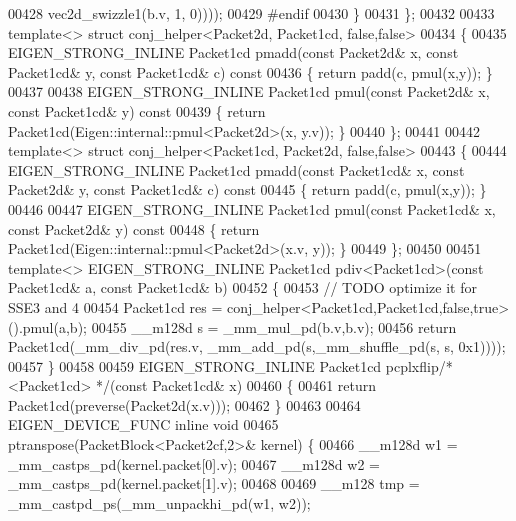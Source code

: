 \begin{DoxyCode}
00428                                            vec2d\_swizzle1(b.v, 1, 0))));
00429 \textcolor{preprocessor}{    #endif}
00430   \}
00431 \};
00432 
00433 \textcolor{keyword}{template}<> \textcolor{keyword}{struct }conj\_helper<Packet2d, Packet1cd, false,false>
00434 \{
00435   EIGEN\_STRONG\_INLINE Packet1cd pmadd(\textcolor{keyword}{const} Packet2d& x, \textcolor{keyword}{const} Packet1cd& y, \textcolor{keyword}{const} Packet1cd& c)\textcolor{keyword}{ const}
00436 \textcolor{keyword}{  }\{ \textcolor{keywordflow}{return} padd(c, pmul(x,y)); \}
00437 
00438   EIGEN\_STRONG\_INLINE Packet1cd pmul(\textcolor{keyword}{const} Packet2d& x, \textcolor{keyword}{const} Packet1cd& y)\textcolor{keyword}{ const}
00439 \textcolor{keyword}{  }\{ \textcolor{keywordflow}{return} Packet1cd(Eigen::internal::pmul<Packet2d>(x, y.v)); \}
00440 \};
00441 
00442 \textcolor{keyword}{template}<> \textcolor{keyword}{struct }conj\_helper<Packet1cd, Packet2d, false,false>
00443 \{
00444   EIGEN\_STRONG\_INLINE Packet1cd pmadd(\textcolor{keyword}{const} Packet1cd& x, \textcolor{keyword}{const} Packet2d& y, \textcolor{keyword}{const} Packet1cd& c)\textcolor{keyword}{ const}
00445 \textcolor{keyword}{  }\{ \textcolor{keywordflow}{return} padd(c, pmul(x,y)); \}
00446 
00447   EIGEN\_STRONG\_INLINE Packet1cd pmul(\textcolor{keyword}{const} Packet1cd& x, \textcolor{keyword}{const} Packet2d& y)\textcolor{keyword}{ const}
00448 \textcolor{keyword}{  }\{ \textcolor{keywordflow}{return} Packet1cd(Eigen::internal::pmul<Packet2d>(x.v, y)); \}
00449 \};
00450 
00451 \textcolor{keyword}{template}<> EIGEN\_STRONG\_INLINE Packet1cd pdiv<Packet1cd>(\textcolor{keyword}{const} Packet1cd& a, \textcolor{keyword}{const} Packet1cd& b)
00452 \{
00453   \textcolor{comment}{// TODO optimize it for SSE3 and 4}
00454   Packet1cd res = conj\_helper<Packet1cd,Packet1cd,false,true>().pmul(a,b);
00455   \_\_m128d s = \_mm\_mul\_pd(b.v,b.v);
00456   \textcolor{keywordflow}{return} Packet1cd(\_mm\_div\_pd(res.v, \_mm\_add\_pd(s,\_mm\_shuffle\_pd(s, s, 0x1))));
00457 \}
00458 
00459 EIGEN\_STRONG\_INLINE Packet1cd pcplxflip\textcolor{comment}{/* <Packet1cd> */}(\textcolor{keyword}{const} Packet1cd& x)
00460 \{
00461   \textcolor{keywordflow}{return} Packet1cd(preverse(Packet2d(x.v)));
00462 \}
00463 
00464 EIGEN\_DEVICE\_FUNC \textcolor{keyword}{inline} \textcolor{keywordtype}{void}
00465 ptranspose(PacketBlock<Packet2cf,2>& kernel) \{
00466   \_\_m128d w1 = \_mm\_castps\_pd(kernel.packet[0].v);
00467   \_\_m128d w2 = \_mm\_castps\_pd(kernel.packet[1].v);
00468 
00469   \_\_m128 tmp = \_mm\_castpd\_ps(\_mm\_unpackhi\_pd(w1, w2));

\end{DoxyCode}
